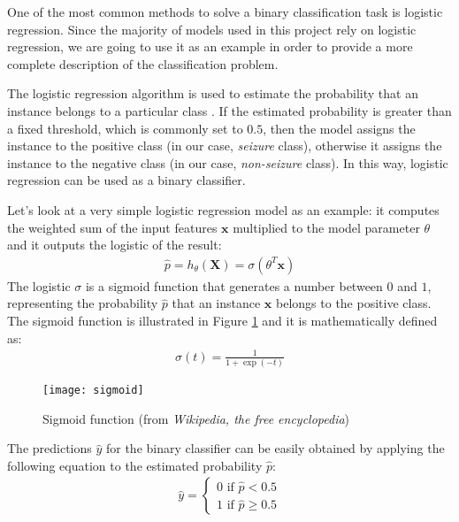 One of the most common methods to solve a binary classification task is logistic regression. Since the majority of models used in this project rely on logistic regression, we are going to use it as an example in order to provide a more complete description of the classification problem.

The logistic regression algorithm is used to estimate the probability that an instance belongs to a particular class \cite{OReilly:handsonML}. If the estimated probability is greater than a fixed threshold, which is commonly set to $0.5$, then the model assigns the instance to the positive class (in our case, \textit{seizure} class), otherwise it assigns the instance to the negative class (in our case, \textit{non-seizure} class). In this way, logistic regression can be used as a binary classifier.

Let's look at a very simple logistic regression model as an example: it computes the weighted sum of the input features $\mathbf{x}$ multiplied to the model parameter $\theta$ and it outputs the logistic of the result:
\begin{align}
    \hat{p} = h_{\theta}(\mathbf{X}) = \sigma\left(\theta^T \mathbf{x}\right)
\end{align}
The logistic $\sigma$ is a sigmoid function that generates a number between $0$ and $1$, representing the probability $\hat{p}$ that an instance $\mathbf{x}$ belongs to the positive class. The sigmoid function is illustrated in Figure \ref{fig:sigmoid} and it is mathematically defined as:
\begin{align}
    \sigma(t) = \frac{1}{1 + \exp{(-t)}}
\end{align}

\begin{figure}[htbp]
    \centering
    \texttt{[image: sigmoid]}
    \caption{Sigmoid function (from \textit{Wikipedia, the free encyclopedia})}
    \label{fig:sigmoid}
\end{figure}

The predictions $\hat{y}$ for the binary classifier can be easily obtained by applying the following equation to the estimated probability $\hat{p}$:
\begin{align}
    \hat{y} = \left\{\begin{array}{l}{0 \text { if } \hat{p}<0.5} \\ {1 \text { if } \hat{p} \geq 0.5}\end{array}\right.
\end{align}

